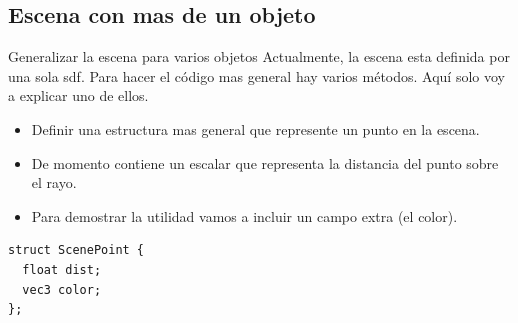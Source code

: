 \subsection{Escena con mas de un objeto}
\begin{frame}[fragile]{Generalizar la escena para varios objetos}
Actualmente, la escena esta definida por una sola sdf.
Para hacer el código mas general hay varios métodos.
Aquí solo voy a explicar uno de ellos.

\begin{itemize}
    \item Definir una estructura mas general que represente un punto en la escena.
    \item De momento contiene un escalar que representa la distancia del punto sobre el rayo.
    \item Para demostrar la utilidad vamos a incluir un campo extra (el color).
\end{itemize}

\begin{listing}
\begin{verbatim}
struct ScenePoint {
  float dist;
  vec3 color;
};
\end{verbatim}
\end{listing}

\end{frame}

